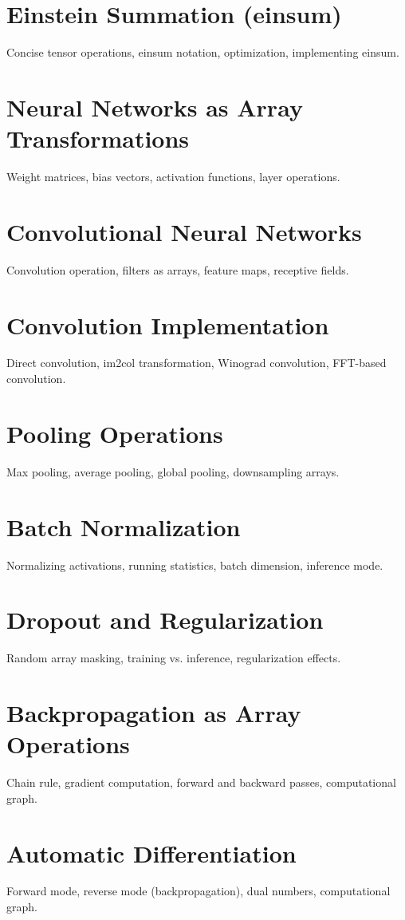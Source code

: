 \chapter{Einstein Summation (einsum)}
Concise tensor operations, einsum notation, optimization, implementing einsum.

\chapter{Neural Networks as Array Transformations}
Weight matrices, bias vectors, activation functions, layer operations.

\chapter{Convolutional Neural Networks}
Convolution operation, filters as arrays, feature maps, receptive fields.

\chapter{Convolution Implementation}
Direct convolution, im2col transformation, Winograd convolution, FFT-based convolution.

\chapter{Pooling Operations}
Max pooling, average pooling, global pooling, downsampling arrays.

\chapter{Batch Normalization}
Normalizing activations, running statistics, batch dimension, inference mode.

\chapter{Dropout and Regularization}
Random array masking, training vs. inference, regularization effects.

\chapter{Backpropagation as Array Operations}
Chain rule, gradient computation, forward and backward passes, computational graph.

\chapter{Automatic Differentiation}
Forward mode, reverse mode (backpropagation), dual numbers, computational graph.

